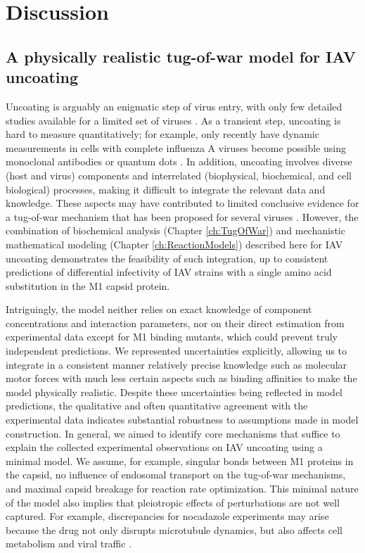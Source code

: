 \section{Discussion}

\subsection{A physically realistic tug-of-war model for IAV uncoating}

Uncoating is arguably an enigmatic step of virus entry, with only few detailed studies available for a limited set of viruses \cite{helenius2018virus, walsh2019exploitation}. As a transient step, uncoating is hard to measure quantitatively; for example, only recently have dynamic measurements in cells with complete influenza A viruses become possible using monoclonal antibodies \cite{banerjee2014influenza} or quantum dots \cite{qin2019real}. In addition, uncoating involves diverse (host and virus) components and interrelated (biophysical, biochemical, and cell biological) processes, making it difficult to integrate the relevant data and knowledge. These aspects may have contributed to limited conclusive evidence for a tug-of-war mechanism that has been proposed for several viruses \cite{banerjee2014influenza, lukic2014hiv, radtke2010plus, strunze2011kinesin}. However, the combination of biochemical analysis (Chapter \ref{ch:TugOfWar}) and mechanistic mathematical modeling (Chapter \ref{ch:ReactionModels}) described here for IAV uncoating demonstrates the feasibility of such integration, up to consistent predictions of differential infectivity of IAV strains with a single amino acid substitution in the M1 capsid protein.

Intriguingly, the model neither relies on exact knowledge of component concentrations and interaction parameters, nor on their direct estimation from experimental data except for M1 binding mutants, which could prevent truly independent predictions. We represented uncertainties explicitly, allowing us to integrate in a consistent manner relatively precise knowledge such as molecular motor forces with much less certain aspects such as binding affinities to make the model physically realistic. Despite these uncertainties being reflected in model predictions, the qualitative and often quantitative agreement with the experimental data indicates substantial robustness to assumptions made in model construction. In general, we aimed to identify core mechanisms that suffice to explain the collected experimental observations on IAV uncoating using a minimal model. We assume, for example, singular bonds between M1 proteins in the capsid, no influence of endosomal transport on the tug-of-war mechanisms, and maximal capsid breakage for reaction rate optimization. This minimal nature of the model also implies that pleiotropic effects of perturbations are not well captured. For example, discrepancies for nocadazole experiments may arise because the drug not only disrupts microtubule dynamics, but also affects cell metabolism and viral traffic \cite{naghavi2017microtubule}.

